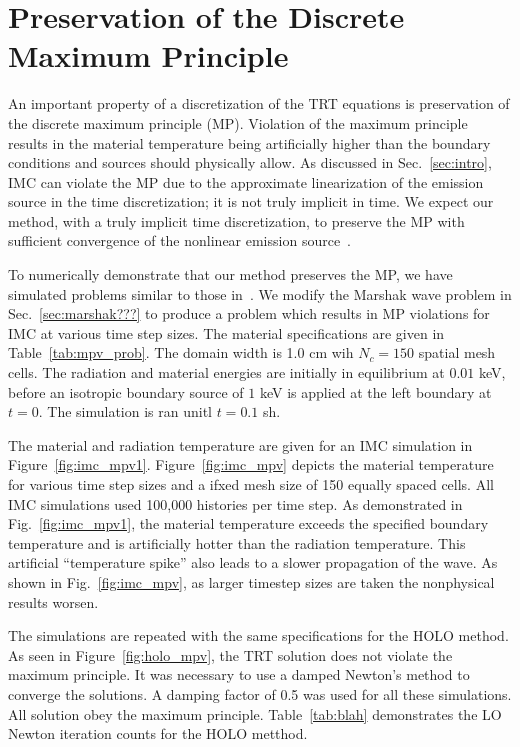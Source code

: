 
\section{Preservation of the Discrete Maximum Principle}

An important property of a discretization of the TRT equations is preservation of the
discrete maximum principle (MP).  Violation of the maximum principle results in
the material temperature being artificially higher than the boundary conditions and
sources should physically allow. As discussed in Sec.~\ref{sec:intro}, IMC can violate the MP due to the approximate
linearization of the emission source in the time discretization; it is not truly implicit in time. 
We expect our
method, with a truly implicit time discretization, to preserve the MP with sufficient
convergence of the nonlinear emission source~\cite{larsen_mpv}.

To numerically demonstrate that our method preserves the MP, we have simulated problems similar to those in~\cite{wollaber2013discrete}.
We modify the Marshak wave problem in Sec.~\ref{sec:marshak???} to produce a problem which
results in MP violations for IMC at various time step sizes.  The material specifications
are given in Table~\ref{tab:mpv_prob}. The domain width is 1.0 cm wih $N_c=150$ spatial mesh cells.  The radiation and material energies are initially in
equilibrium at $0.01$ keV, before an isotropic boundary source of $1$ keV is applied at
the left boundary at $t=0$. The simulation is ran unitl $t=0.1$ sh. 

The material and radiation temperature are given for an IMC simulation in Figure~\ref{fig:imc_mpv1}.  Figure~\ref{fig:imc_mpv} depicts the material temperature for various time step sizes and a ifxed
mesh size of 150 equally spaced cells. All IMC simulations used 100,000 histories per time
step. As demonstrated in Fig.~\ref{fig:imc_mpv1}, the material temperature exceeds the
specified boundary temperature and is artificially hotter than the radiation temperature.
This artificial ``temperature spike'' also leads to a slower propagation of the wave.
As shown in Fig.~\ref{fig:imc_mpv}, as larger timestep sizes are taken the nonphysical results worsen.

The simulations are repeated with the same specifications for the HOLO method. As seen in
Figure~\ref{fig:holo_mpv}, the TRT solution does not violate the maximum principle. It was
necessary to use a damped Newton's method to converge the solutions.  A damping factor of
0.5 was used for all these simulations.  All solution obey the maximum principle.
Table~\ref{tab:blah} demonstrates the LO Newton iteration counts for the HOLO metthod.





